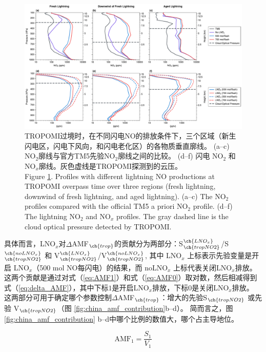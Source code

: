 \begin{figure}[!htbp]
    \includegraphics[width=17cm]{./figures/china_nox_profile.pdf}
    \caption{
    TROPOMI过境时，在不同闪电NO的排放条件下，三个区域（新生闪电区，闪电下风向，和闪电老化区）的各物质垂直廓线。
     (a--c) NO$_2$廓线与官方TM5先验NO$_2$廓线之间的比较。
     (d--f) 闪电 NO$_2$ 和 NO$_x$廓线。灰色虚线是TROPOMI探测到的云压。\\
     Figure \ref{fig:china_nox_profile}. Profiles with different lightning NO productions at TROPOMI overpass time over three regions (fresh lightning, downwind of fresh lightning, and aged lightning).
    (a--c) The NO$_2$ profiles compared with the official TM5 a priori NO$_2$ profile.
    (d--f) The lightning NO$_2$ and NO$_x$ profiles.
    The gray dashed line is the cloud optical pressure detected by TROPOMI.
    }
    \label{fig:china_nox_profile}
\end{figure}


具体而言，LNO$_x$对$\Delta$AMF$_{\ch{trop}}$的贡献分为两部分：S$^{\ch{LNO_x}}_{\ch{tropNO2}}$/S$^{\ch{noLNO_x}}_{\ch{tropNO2}}$ 和 V$^{\ch{LNO_x}}_{\ch{tropNO2}}$/V$^{\ch{noLNO_x}}_{\ch{tropNO2}}$,
其中 LNO$_x$ 上标表示先验变量是开启 LNO$_x$（500 mol NO每闪电）的结果，而 noLNO$_x$ 上标代表关闭LNO$_x$排放。
这两个贡献是通过对式（\ref{eq:AMF1}）和式（\ref{eq:AMF0}）取对数，然后相减得到式（\ref{eq:delta_AMF}），其中下标$1$是开启LNO$_x$排放，下标$0$是关闭LNO$_x$排放。
这两部分可用于确定哪个参数控制$\Delta$AMF$_{\ch{trop}}$：增大的先验S$_{\ch{tropNO2}}$ 或先验 V$_{\ch{tropNO2}}$（图 \ref{fig:china_amf_contribution}b--d）。
简而言之，图 \ref{fig:china_amf_contribution} b--d中哪个比例的数值大，哪个占主导地位。

\begin{equation} \label{eq:AMF1}
\textrm{AMF}_1 = \frac{S_1}{V_1}
\end{equation}

